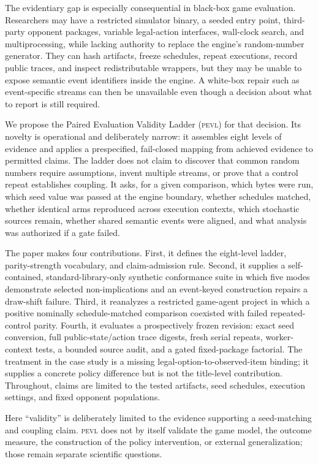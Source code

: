\documentclass[aps,reprint,superscriptaddress,longbibliography,floatfix]{revtex4-2}
\newcommand{\PEVL}{\textsc{pevl}}
\begin{document}
The evidentiary gap is especially consequential in black-box game evaluation.
Researchers may have a restricted simulator binary, a seeded entry point,
third-party opponent packages, variable legal-action interfaces, wall-clock
search, and multiprocessing, while lacking authority to replace the engine's
random-number generator.  They can hash artifacts, freeze schedules, repeat
executions, record public traces, and inspect redistributable wrappers, but they
may be unable to expose semantic event identifiers inside the engine.  A
white-box repair such as event-specific streams can then be unavailable even
though a decision about what to report is still required.

We propose the Paired Evaluation Validity Ladder (\PEVL) for that decision.
Its novelty is operational and deliberately narrow: it assembles eight levels
of evidence and applies a prespecified, fail-closed mapping from achieved
evidence to permitted claims.  The ladder does not claim to discover that
common random numbers require assumptions, invent multiple streams, or prove
that a control repeat establishes coupling.  It asks, for a given comparison,
which bytes were run, which seed value was passed at the engine boundary,
whether schedules matched,
whether identical arms reproduced across execution contexts, which stochastic
sources remain, whether shared semantic events were aligned, and what analysis
was authorized if a gate failed.

The paper makes four contributions.  First, it defines the eight-level ladder,
parity-strength vocabulary, and claim-admission rule.  Second, it supplies a
self-contained, standard-library-only synthetic conformance suite in which five
modes demonstrate selected non-implications and an event-keyed construction
repairs a draw-shift failure.  Third, it reanalyzes a restricted game-agent
project in which a positive nominally schedule-matched comparison coexisted with
failed repeated-control parity.  Fourth,
it evaluates a prospectively frozen revision: exact seed conversion, full
public-state/action trace digests, fresh serial repeats, worker-context tests,
a bounded source audit, and a gated fixed-package factorial.  The treatment in
the case study is a missing legal-option-to-observed-item binding; it supplies a
concrete policy difference but is not the title-level contribution.  Throughout,
claims are limited to the tested artifacts, seed schedules, execution settings,
and fixed opponent populations.

Here ``validity'' is deliberately limited to the evidence supporting a
seed-matching and coupling claim.  \PEVL{} does not by itself validate the game
model, the outcome measure, the construction of the policy intervention, or
external generalization; those remain separate scientific questions.
\end{document}

